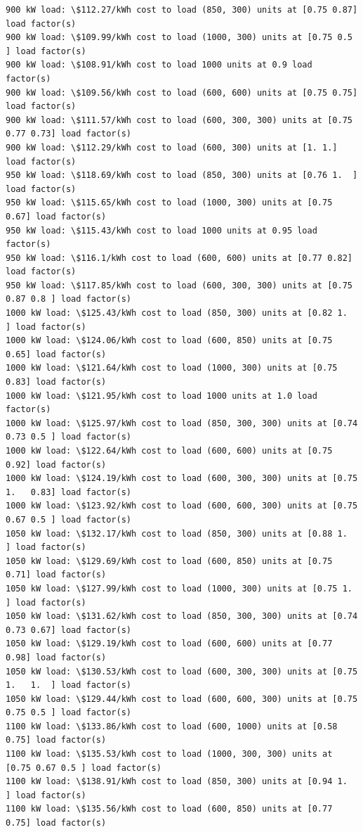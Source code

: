 \documentclass[11pt]{article}
\begin{document}
\begin{Verbatim}[commandchars=\\\{\}]
900 kW load: \$112.27/kWh cost to load (850, 300) units at [0.75 0.87] load factor(s)
900 kW load: \$109.99/kWh cost to load (1000, 300) units at [0.75 0.5 ] load factor(s)
900 kW load: \$108.91/kWh cost to load 1000 units at 0.9 load factor(s)
900 kW load: \$109.56/kWh cost to load (600, 600) units at [0.75 0.75] load factor(s)
900 kW load: \$111.57/kWh cost to load (600, 300, 300) units at [0.75 0.77 0.73] load factor(s)
900 kW load: \$112.29/kWh cost to load (600, 300) units at [1. 1.] load factor(s)
950 kW load: \$118.69/kWh cost to load (850, 300) units at [0.76 1.  ] load factor(s)
950 kW load: \$115.65/kWh cost to load (1000, 300) units at [0.75 0.67] load factor(s)
950 kW load: \$115.43/kWh cost to load 1000 units at 0.95 load factor(s)
950 kW load: \$116.1/kWh cost to load (600, 600) units at [0.77 0.82] load factor(s)
950 kW load: \$117.85/kWh cost to load (600, 300, 300) units at [0.75 0.87 0.8 ] load factor(s)
1000 kW load: \$125.43/kWh cost to load (850, 300) units at [0.82 1.  ] load factor(s)
1000 kW load: \$124.06/kWh cost to load (600, 850) units at [0.75 0.65] load factor(s)
1000 kW load: \$121.64/kWh cost to load (1000, 300) units at [0.75 0.83] load factor(s)
1000 kW load: \$121.95/kWh cost to load 1000 units at 1.0 load factor(s)
1000 kW load: \$125.97/kWh cost to load (850, 300, 300) units at [0.74 0.73 0.5 ] load factor(s)
1000 kW load: \$122.64/kWh cost to load (600, 600) units at [0.75 0.92] load factor(s)
1000 kW load: \$124.19/kWh cost to load (600, 300, 300) units at [0.75 1.   0.83] load factor(s)
1000 kW load: \$123.92/kWh cost to load (600, 600, 300) units at [0.75 0.67 0.5 ] load factor(s)
1050 kW load: \$132.17/kWh cost to load (850, 300) units at [0.88 1.  ] load factor(s)
1050 kW load: \$129.69/kWh cost to load (600, 850) units at [0.75 0.71] load factor(s)
1050 kW load: \$127.99/kWh cost to load (1000, 300) units at [0.75 1.  ] load factor(s)
1050 kW load: \$131.62/kWh cost to load (850, 300, 300) units at [0.74 0.73 0.67] load factor(s)
1050 kW load: \$129.19/kWh cost to load (600, 600) units at [0.77 0.98] load factor(s)
1050 kW load: \$130.53/kWh cost to load (600, 300, 300) units at [0.75 1.   1.  ] load factor(s)
1050 kW load: \$129.44/kWh cost to load (600, 600, 300) units at [0.75 0.75 0.5 ] load factor(s)
1100 kW load: \$133.86/kWh cost to load (600, 1000) units at [0.58 0.75] load factor(s)
1100 kW load: \$135.53/kWh cost to load (1000, 300, 300) units at [0.75 0.67 0.5 ] load factor(s)
1100 kW load: \$138.91/kWh cost to load (850, 300) units at [0.94 1.  ] load factor(s)
1100 kW load: \$135.56/kWh cost to load (600, 850) units at [0.77 0.75] load factor(s)

\end{Verbatim}
\end{document}
